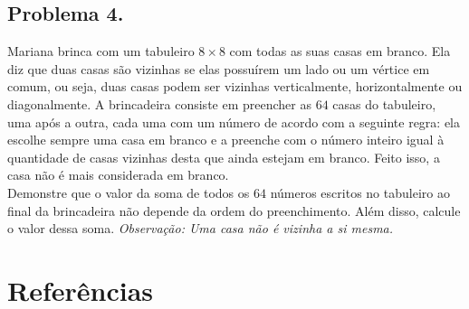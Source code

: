 \documentclass[12pt]{article}
\begin{document}
    \clearpage

    \subsection{Problema 4.}
      \begin{tcolorbox}[problembox]
         Mariana brinca com um tabuleiro $8 \times 8$ com todas as suas casas em branco.
          Ela diz que duas casas são vizinhas se elas possuírem um lado ou um vértice em
          comum, ou seja, duas casas podem ser vizinhas verticalmente, horizontalmente ou
          diagonalmente. A brincadeira consiste em preencher as $64$ casas do tabuleiro,
          uma após a outra, cada uma com um número de acordo com a seguinte regra:
          ela escolhe sempre uma casa em branco e a preenche com o número inteiro igual
          à quantidade de casas vizinhas desta que ainda estejam em branco. Feito isso,
          a casa não é mais considerada em branco. \\

          Demonstre que o valor da soma de todos os $64$ números escritos no tabuleiro
          ao final da brincadeira não depende da ordem do preenchimento. Além disso,
          calcule o valor dessa soma.
         \textit{Observação: Uma casa não é vizinha a si mesma.}
      \end{tcolorbox}

    \clearpage

  \section{\textsf{Referências}}
\end{document}
